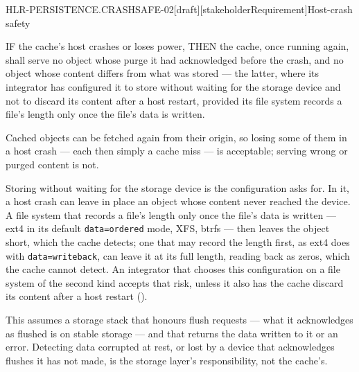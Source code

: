 \begin{requirement}{HLR-PERSISTENCE.CRASHSAFE-02}[draft][stakeholderRequirement]{Host-crash safety}


  IF the cache's host crashes or loses power, THEN the cache, once running
  again, shall serve no object whose purge it had acknowledged before the
  crash, and no object whose content differs from what was stored --- the
  latter, where its integrator has configured it to store without waiting
  for the storage device and not to discard its content after a host
  restart, provided its file system records a file's length only once the
  file's data is written.

  Cached objects can be fetched again from their origin, so losing some of
  them in a host crash --- each then simply a cache miss --- is acceptable;
  serving wrong or purged content is not.

  Storing without waiting for the storage device is the configuration
   asks for. In it, a host crash can
  leave in place an object whose content never reached the device. A file
  system that records a file's length only once the file's data is written
  --- ext4 in its default \texttt{data=ordered} mode, XFS, btrfs --- then
  leaves the object short, which the cache detects; one that may record the
  length first, as ext4 does with \texttt{data=writeback}, can leave it at
  its full length, reading back as zeros, which the cache cannot detect. An
  integrator that chooses this configuration on a file system of the second
  kind accepts that risk, unless it also has the cache discard its content
  after a host restart ().

  This assumes a storage stack that honours flush requests --- what it
  acknowledges as flushed is on stable storage --- and that returns the data
  written to it or an error. Detecting data corrupted at rest, or lost by a
  device that acknowledges flushes it has not made, is the storage layer's
  responsibility, not the cache's.


\end{requirement}

